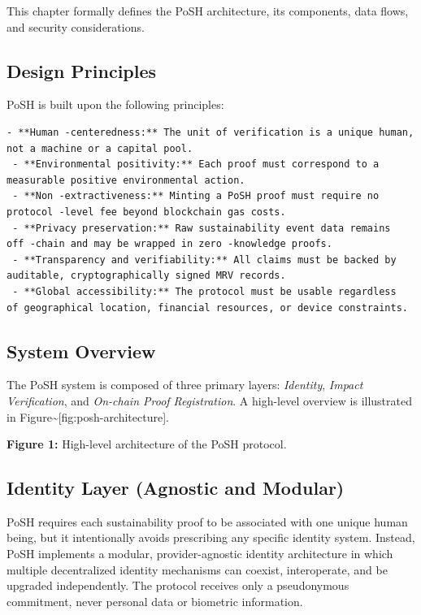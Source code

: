 \documentclass{article}
\begin{document}
This chapter formally defines the PoSH architecture, its components, data flows,
and security considerations.

\subsection{Design Principles}

PoSH is built upon the following principles:

\begin{verbatim}
- **Human -centeredness:** The unit of verification is a unique human,
not a machine or a capital pool.
 - **Environmental positivity:** Each proof must correspond to a
measurable positive environmental action.
 - **Non -extractiveness:** Minting a PoSH proof must require no
protocol -level fee beyond blockchain gas costs.
 - **Privacy preservation:** Raw sustainability event data remains
off -chain and may be wrapped in zero -knowledge proofs.
 - **Transparency and verifiability:** All claims must be backed by
auditable, cryptographically signed MRV records.
 - **Global accessibility:** The protocol must be usable regardless
of geographical location, financial resources, or device constraints.
\end{verbatim}

\subsection{System Overview}

The PoSH system is composed of three primary layers:
\textit{Identity}, \textit{Impact Verification}, and \textit{On-chain Proof
Registration}. A high-level overview is illustrated in
Figure{\textasciitilde}[fig:posh-architecture].

\textbf{Figure 1:} High-level architecture of the PoSH protocol.

\subsection{Identity Layer (Agnostic and Modular)}

PoSH requires each sustainability proof to be associated with one unique human
being, but it intentionally avoids prescribing any specific identity system.
Instead, PoSH implements a modular, provider-agnostic identity architecture in
which multiple decentralized identity mechanisms can coexist, interoperate, and
be upgraded independently. The protocol receives only a pseudonymous commitment,
never personal data or biometric information.
\end{document}
